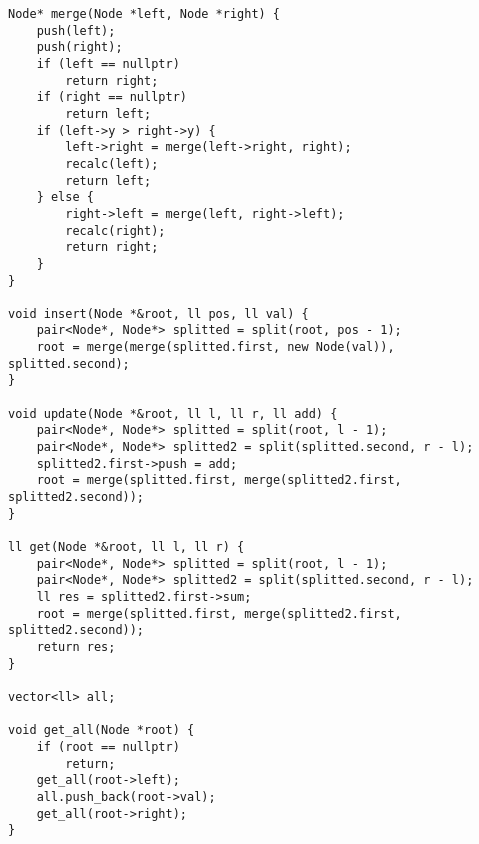 \begin{lstlisting}
Node* merge(Node *left, Node *right) {
    push(left);
    push(right);
    if (left == nullptr)
        return right;
    if (right == nullptr)
        return left;
    if (left->y > right->y) {
        left->right = merge(left->right, right);
        recalc(left);
        return left;
    } else {
        right->left = merge(left, right->left);
        recalc(right);
        return right;
    }
}

void insert(Node *&root, ll pos, ll val) {
    pair<Node*, Node*> splitted = split(root, pos - 1);
    root = merge(merge(splitted.first, new Node(val)), splitted.second);
}

void update(Node *&root, ll l, ll r, ll add) {
    pair<Node*, Node*> splitted = split(root, l - 1);
    pair<Node*, Node*> splitted2 = split(splitted.second, r - l);
    splitted2.first->push = add;
    root = merge(splitted.first, merge(splitted2.first, splitted2.second));
}

ll get(Node *&root, ll l, ll r) {
    pair<Node*, Node*> splitted = split(root, l - 1);
    pair<Node*, Node*> splitted2 = split(splitted.second, r - l);
    ll res = splitted2.first->sum;
    root = merge(splitted.first, merge(splitted2.first, splitted2.second));
    return res;
}

vector<ll> all;

void get_all(Node *root) {
    if (root == nullptr)
        return;
    get_all(root->left);
    all.push_back(root->val);
    get_all(root->right);
}

\end{lstlisting}
